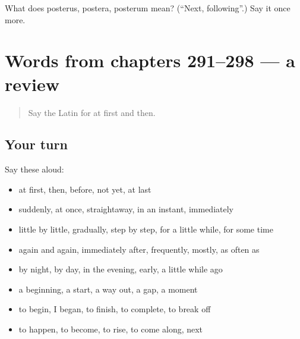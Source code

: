 \begin{tcolorbox}[breakable,colback=teal!4,colframe=teal!35!black,title={Before you move on}]
What does posterus, postera, posterum mean? (\textquotedblleft{}Next, following\textquotedblright{}.) Say it once more.
\end{tcolorbox}
\section[(dialogue)]{Words from chapters 291–298 — a review}

\label{lesson:LA-R298-review-291-298}



\begin{quote}
Say the Latin for at first and then.
\end{quote}

\subsection*{Your turn}
Say these aloud:

\begin{itemize}
\raggedright
  \item at first, then, before, not yet, at last
  \item suddenly, at once, straightaway, in an instant, immediately
  \item little by little, gradually, step by step, for a little while, for some time
  \item again and again, immediately after, frequently, mostly, as often as
  \item by night, by day, in the evening, early, a little while ago
  \item a beginning, a start, a way out, a gap, a moment
  \item to begin, I began, to finish, to complete, to break off
  \item to happen, to become, to rise, to come along, next
\end{itemize}

